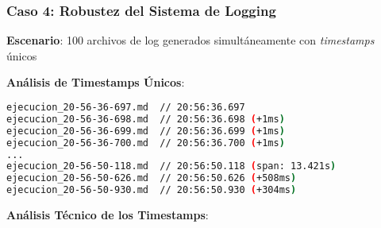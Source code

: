 \subsubsection{Caso 4: Robustez del Sistema de Logging}

\textbf{Escenario}: 100 archivos de log generados simultáneamente con \textit{timestamps} únicos

\textbf{Análisis de Timestamps Únicos}:
\begin{lstlisting}[language=bash,caption={Distribución Temporal de Logs - Muestra Representativa},label={lst:distribucion-logs}]
ejecucion_20-56-36-697.md  // 20:56:36.697
ejecucion_20-56-36-698.md  // 20:56:36.698 (+1ms)
ejecucion_20-56-36-699.md  // 20:56:36.699 (+1ms)
ejecucion_20-56-36-700.md  // 20:56:36.700 (+1ms)
...
ejecucion_20-56-50-118.md  // 20:56:50.118 (span: 13.421s)
ejecucion_20-56-50-626.md  // 20:56:50.626 (+508ms)
ejecucion_20-56-50-930.md  // 20:56:50.930 (+304ms)
\end{lstlisting}

\textbf{Análisis Técnico de los Timestamps}:

